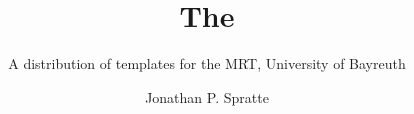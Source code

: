 \documentclass[oneside,UKenglish]{MRTthesis}
\title{The \cls{MRTbundle}}
\subtitle
  {A distribution of templates for the MRT, University of Bayreuth}
\author{Jonathan P. Spratte}
\begin{document}
\maketitle
\tableofcontents
\mainpart






\end{document}
